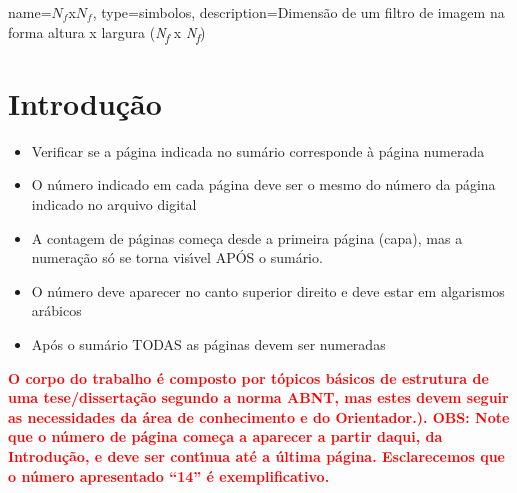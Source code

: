 {%
	name=$N_{f}$x$N_{f}$,
	type=simbolos,
	description={Dimensão de um filtro de imagem na forma altura x largura (\textit{N\textsubscript{f}} x \textit{N\textsubscript{f}})}
}

\printglossary[type=simbolos,title={List of Symbols}]
\cleardoublepage

\tableofcontents*
\cleardoublepage



\textual

\linenumbers
\chapter{Introdu\c{c}\~{a}o}
\label{cap:intro}

\begin{itemize}
    \item Verificar se a p\'{a}gina indicada no sum\'{a}rio corresponde \`{a} p\'{a}gina numerada
    \item O n\'{u}mero indicado em cada p\'{a}gina deve ser o mesmo do n\'{u}mero da p\'{a}gina indicado no arquivo digital
    \item A contagem de p\'{a}ginas come\c{c}a desde a primeira p\'{a}gina (capa), mas a numera\c{c}\~{a}o s\'{o} se torna vis\'{\i}vel AP\'{O}S o sum\'{a}rio.
    \item O n\'{u}mero deve aparecer no canto superior direito e deve estar em algarismos ar\'{a}bicos
    \item Ap\'{o}s o sum\'{a}rio TODAS as p\'{a}ginas devem ser numeradas
\end{itemize}


\textbf{\textcolor{red}{O corpo do trabalho \'{e} composto por t\'{o}picos b\'{a}sicos de estrutura de uma tese/disserta\c{c}\~{a}o segundo a norma ABNT, mas estes devem seguir as necessidades da \'{a}rea de conhecimento e do Orientador.).  OBS: Note que o n\'{u}mero de p\'{a}gina come\c{c}a a aparecer a partir daqui, da Introdu\c{c}\~{a}o, e deve ser cont\'{\i}nua at\'{e} a \'{u}ltima p\'{a}gina. Esclarecemos que o n\'{u}mero apresentado “14” \'{e} exemplificativo.   }}


